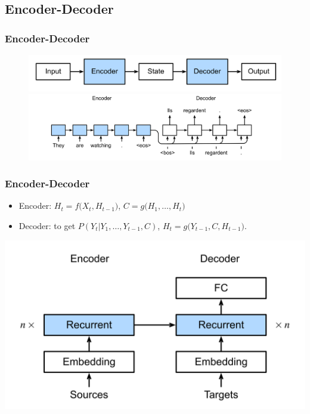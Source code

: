\documentclass[]{beamer}
\begin{document}
\subsection{Encoder-Decoder}
\begin{frame}
    \frametitle{Encoder-Decoder}
    \begin{figure}
        \centering
        \includegraphics[scale=0.08]{encoder-decoder.png}
        \includegraphics[scale=0.10]{seq2seq.png}
    \end{figure}   
    \centering
\end{frame}
\begin{frame}
    \frametitle{Encoder-Decoder}
    \begin{itemize}[label = \textbullet]
        \item Encoder: $H_t = f\bigl(X_t, H_{t-1}\bigr)$, $C = g\bigl(H_1, \ldots, H_t\bigr)$
        \item Decoder: to get $P(Y_t | Y_1, \ldots, Y_{t-1}, C)$, $H_t = g\bigl(Y_{t-1}, C, H_{t-1}\bigr)$.
    \end{itemize}
    \centering
    \includegraphics[scale = 0.1]{RNN-en-de.png}
\end{frame}
\end{document}
